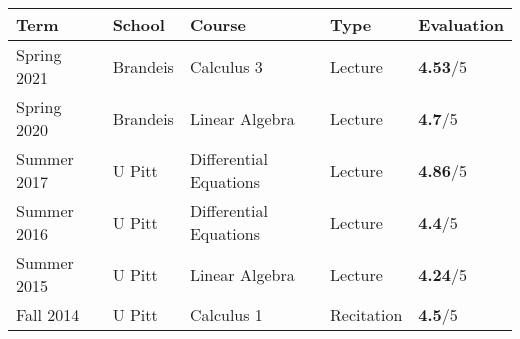 \begin{tabular}{lllll}
	Term & School & Course & Type & \textbf{Evaluation}\\
	\hline
	Spring 2021 &Brandeis & Calculus 3 & Lecture &  \textbf{4.53}/5\\
	Spring 2020 &Brandeis & Linear Algebra & Lecture &  \textbf{4.7}/5\\
	Summer 2017 &U Pitt & Differential Equations & Lecture &  \textbf{4.86}/5\\
	Summer 2016 &U Pitt & Differential Equations & Lecture &  \textbf{4.4}/5\\
	Summer 2015 &U Pitt & Linear Algebra & Lecture &  \textbf{4.24}/5\\
	Fall 2014 &U Pitt & Calculus 1 & Recitation &  \textbf{4.5}/5\\
\end{tabular}
